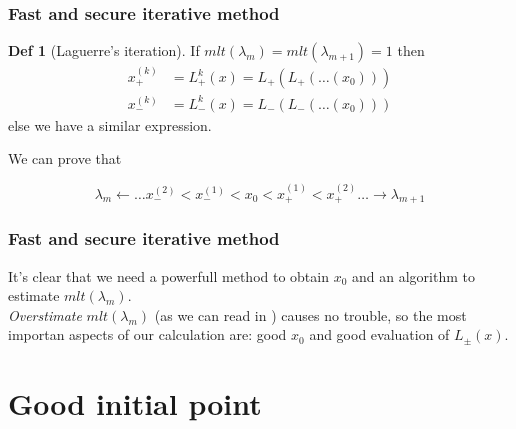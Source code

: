 \documentclass{beamer}
\theoremstyle{definition} \newtheorem{de}{Def}
\theoremstyle{remark} \newtheorem{os}[de]{Oss}
\theoremstyle{plain} \newtheorem{te}[de]{Teo}
\theoremstyle{plain} \newtheorem{co}[de]{Cor}
\theoremstyle{plain} \newtheorem{pr}[de]{Prop}
\theoremstyle{plain} \newtheorem{lem}[de]{Lemm}
\theoremstyle{remark} \newtheorem{rem}[de]{Remark}
\begin{document}
\begin{frame}
\frametitle{Fast and secure iterative method}

\begin{de}[Laguerre's iteration]
  If $mlt(\lambda_m)=mlt(\lambda_{m+1})=1$ then
  \begin{align*}
    x_{+}^{(k)} &= L_{+}^k(x)=L_{+}(L_{+}(\dots(x_{0})))\\
    x_{-}^{(k)} &= L_{-}^k(x)=L_{-}(L_{-}(\dots(x_{0})))
  \end{align*}
  else we have a similar expression.
\end{de} 

We can prove that

\begin{equation*}
  \lambda_m \leftarrow \dots x_{-}^{(2)} < x_{-}^{(1)} < x_{0} < x_{+}^{(1)} < x_{+}^{(2)} \dots \rightarrow \lambda_{m+1}
\end{equation*}
  
\end{frame}


\begin{frame}
\frametitle{Fast and secure iterative method}

It's clear that we need a powerfull method to obtain $x_{0}$ and an algorithm to 
estimate $mlt(\lambda_m)$. \\
\emph{Overstimate} $mlt(\lambda_m)$ (as we can read in \cite{MR1289159}) causes no trouble, so the most importan aspects of our calculation are: good $x_{0}$ and good evaluation of $L_{\pm}(x)$. 
\end{frame}


\section{Good initial point}






\end{document}
